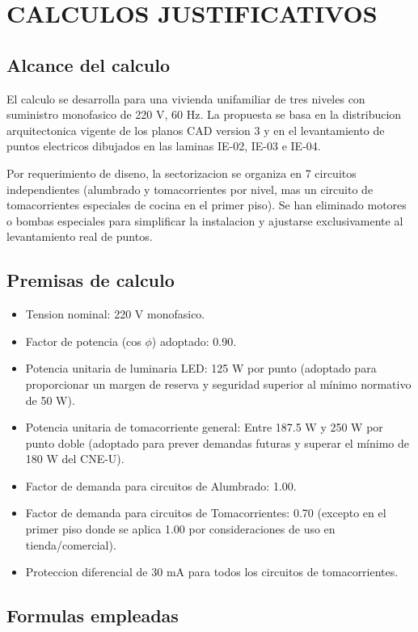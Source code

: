 \chapter{CALCULOS JUSTIFICATIVOS}

\section{Alcance del calculo}

El calculo se desarrolla para una vivienda unifamiliar de tres niveles con suministro monofasico de 220 V, 60 Hz. La propuesta se basa en la distribucion arquitectonica vigente de los planos CAD version 3 y en el levantamiento de puntos electricos dibujados en las laminas IE-02, IE-03 e IE-04.

Por requerimiento de diseno, la sectorizacion se organiza en 7 circuitos independientes (alumbrado y tomacorrientes por nivel, mas un circuito de tomacorrientes especiales de cocina en el primer piso). Se han eliminado motores o bombas especiales para simplificar la instalacion y ajustarse exclusivamente al levantamiento real de puntos.

\section{Premisas de calculo}

\begin{itemize}
  \item Tension nominal: 220 V monofasico.
  \item Factor de potencia (cos $\phi$) adoptado: 0.90.
  \item Potencia unitaria de luminaria LED: 125 W por punto (adoptado para proporcionar un margen de reserva y seguridad superior al mínimo normativo de 50 W).
  \item Potencia unitaria de tomacorriente general: Entre 187.5 W y 250 W por punto doble (adoptado para prever demandas futuras y superar el mínimo de 180 W del CNE-U).
  \item Factor de demanda para circuitos de Alumbrado: 1.00.
  \item Factor de demanda para circuitos de Tomacorrientes: 0.70 (excepto en el primer piso donde se aplica 1.00 por consideraciones de uso en tienda/comercial).
  \item Proteccion diferencial de 30 mA para todos los circuitos de tomacorrientes.
\end{itemize}

\section{Formulas empleadas}

